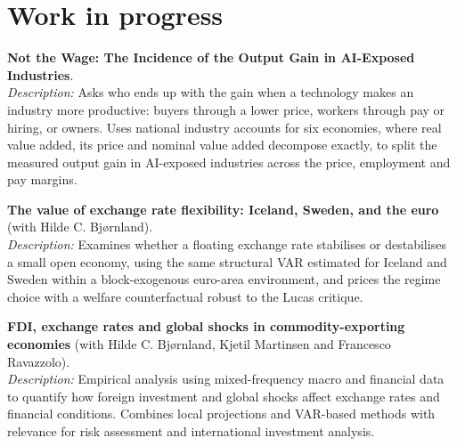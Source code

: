 \documentclass[a4paper,15pt]{article}
\begin{document}
\section{Work in progress}
\small{
\textbf{Not the Wage: The Incidence of the Output Gain in AI-Exposed Industries}.\\
\emph{Description:} Asks who ends up with the gain when a technology makes an industry more productive: buyers through a lower price, workers through pay or hiring, or owners. Uses national industry accounts for six economies, where real value added, its price and nominal value added decompose exactly, to split the measured output gain in AI-exposed industries across the price, employment and pay margins.
}\par\vspace{0.5em}
\small{
\textbf{The value of exchange rate flexibility: Iceland, Sweden, and the euro} (with Hilde C. Bjørnland).\\
\emph{Description:} Examines whether a floating exchange rate stabilises or destabilises a small open economy, using the same structural VAR estimated for Iceland and Sweden within a block-exogenous euro-area environment, and prices the regime choice with a welfare counterfactual robust to the Lucas critique.
}\par\vspace{0.5em}
\small{
\textbf{FDI, exchange rates and global shocks in commodity-exporting economies} (with Hilde C. Bjørnland, Kjetil Martinsen and Francesco Ravazzolo).\\
\emph{Description:} Empirical analysis using mixed-frequency macro and financial data to quantify how foreign investment and global shocks affect exchange rates and financial conditions. Combines local projections and VAR-based methods with relevance for risk assessment and international investment analysis.
}
\end{document}
